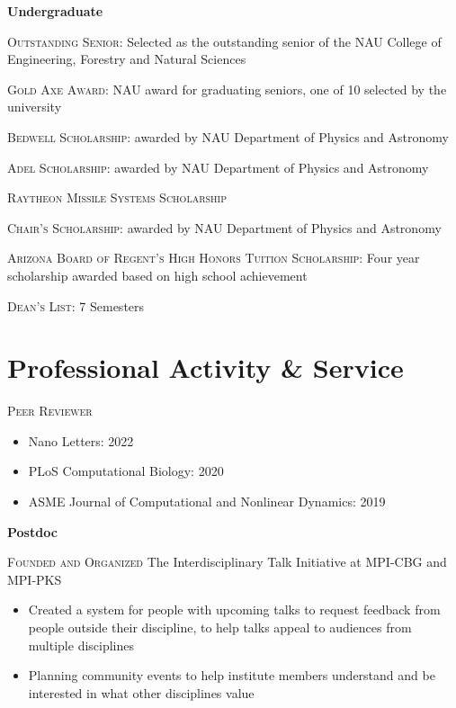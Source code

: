 \documentclass[letterpaper,10pt]{article} %
\begin{document}
{\large \textbf{Undergraduate}}

\begin{description}[itemsep=-1ex]
\item \textsc{Outstanding Senior}: Selected as the outstanding senior of the NAU College of Engineering, Forestry and Natural Sciences
\item \textsc{Gold Axe Award}: NAU award for graduating seniors, one of 10 selected by the university
\item \textsc{Bedwell Scholarship}: awarded by NAU Department of Physics and Astronomy 
\item \textsc{Adel Scholarship}: awarded by NAU Department of Physics and Astronomy 
\item \textsc{Raytheon Missile Systems Scholarship}
\item \textsc{Chair's Scholarship}: awarded by NAU Department of Physics and Astronomy  
\item \textsc{Arizona Board of Regent's High Honors Tuition Scholarship}: Four year scholarship awarded based on high school achievement
\item \textsc{Dean's List}: 7 Semesters
\end{description}


\bigskip
\section*{Professional Activity \& Service}
\bigskip

\textsc{Peer Reviewer}
\begin{itemize}
\item Nano Letters: 2022
\item PLoS Computational Biology: 2020
\item ASME Journal of Computational and Nonlinear Dynamics: 2019
\end{itemize}

\bigskip
{\large \textbf{Postdoc}}

\textsc{Founded and Organized} The Interdisciplinary Talk Initiative at MPI-CBG and MPI-PKS
\begin{itemize}
\item Created a system for people with upcoming talks to request feedback from people outside their discipline, to help talks appeal to audiences from multiple disciplines
\item Planning community events to help institute members understand and be interested in what other disciplines value
\end{itemize}
\end{document}
